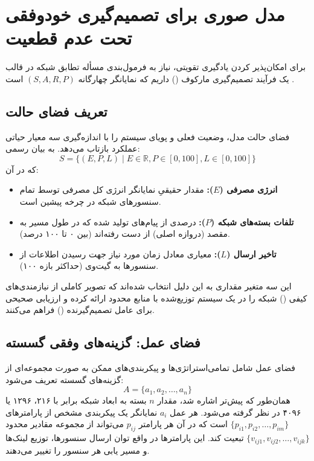 \documentclass[oneside,openany,phd]{TMU-Thesis}
\begin{document}
\section{مدل صوری برای تصمیم‌گیری خودوفقی تحت عدم قطعیت}

برای امکان‌پذیر کردن یادگیری تقویتی، نیاز به فرمول‌بندی مسأله تطابق شبکه در قالب یک فرآیند تصمیم‌گیری مارکوف () داریم که نمایانگر چهارگانه $(S, A, R, P)$ است \cite{RS_DRL_Article}. 

\subsection{تعریف فضای حالت}

فضای حالت مدل، وضعیت فعلی و پویای سیستم را با اندازه‌گیری سه معیار حیاتی عملکرد بازتاب می‌دهد. به بیان رسمی:
$$S = \{(E, P, L) \mid E \in \mathbb{R}, P \in [0,100], L \in [0,100]\}$$
که در آن:
\begin{itemize}
    \item \textbf{انرژی مصرفی ($E$):} مقدار حقیقیِ نمایانگر انرژی کل مصرفی توسط تمام سنسورهای شبکه در چرخه پیشین است.
    \item \textbf{تلفات بسته‌های شبکه ($P$):} درصدی از پیام‌های تولید شده که در طول مسیر به مقصد (دروازه اصلی) از دست رفته‌اند (بین ۰ تا ۱۰۰ درصد).
    \item \textbf{تاخیر ارسال ($L$):} معیاری معادل زمان مورد نیاز جهت رسیدن اطلاعات از سنسورها به گیت‌وی (حداکثر بازه ۱۰۰).
\end{itemize}

این سه متغیر مقداری به این دلیل انتخاب شده‌اند که تصویر کاملی از نیازمندی‌های کیفی () شبکه را در یک سیستم توزیع‌شده با منابع محدود ارائه کرده و ارزیابی صحیحی برای عامل تصمیم‌گیرنده () فراهم می‌کنند.

\subsection{فضای عمل: گزینه‌های وفقی گسسته}

فضای عمل شامل تمامی‌استراتژی‌ها و پیکربندی‌های ممکن به صورت مجموعه‌ای از گزینه‌های گسسته تعریف می‌شود:
$$A = \{a_1, a_2, \ldots, a_n\}$$
همان‌طور که پیش‌تر اشاره شد، مقدار $n$ بسته به ابعاد شبکه  برابر با ۲۱۶، ۱۲۹۶ یا ۴۰۹۶ در نظر گرفته می‌شود. هر عمل $a_i$ نمایانگر یک پیکربندی مشخص از پارامترهای $\{p_{i1}, p_{i2}, \ldots, p_{im}\}$ است که در آن هر پارامتر $p_{ij}$ می‌تواند از مجموعه مقادیر محدود $\{v_{ij1}, v_{ij2}, \ldots, v_{ijk}\}$ تبعیت کند. این پارامترها در واقع توان ارسال سنسورها، توزیع لینک‌ها و مسیر یابی هر سنسور را تغییر می‌دهند.
\end{document}
